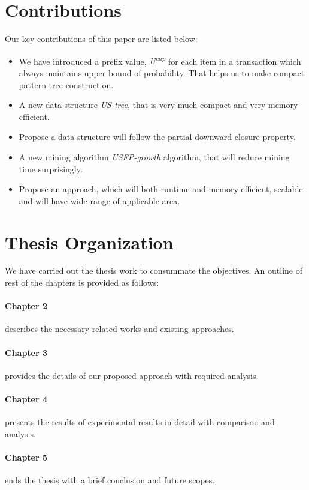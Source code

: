\section{Contributions}
Our key contributions of this paper are listed below:
\begin{itemize}
	\item We have introduced a prefix value, \emph{U\textsuperscript{cap}} for each item in a transaction which always maintains upper bound of probability. That helps us to make compact pattern tree construction.
	\item A new data-structure \emph{US-tree}, that is very much compact and very memory efficient.
	\item Propose a data-structure will follow the partial downward closure property.
	\item A new mining algorithm \emph{USFP-growth} algorithm, that will reduce mining time surprisingly.
	\item Propose an approach, which will both runtime and memory efficient, scalable and will have wide range of applicable area.
	\end{itemize}
\section{Thesis Organization}
	We have carried out the thesis work to consummate the objectives. An outline of rest of the chapters is provided as follows:
	\paragraph{Chapter 2} describes the necessary related works and existing approaches.
	\paragraph{Chapter 3} provides the details of our proposed approach with required analysis.
	\paragraph{Chapter 4} presents the results of experimental results in detail with comparison and analysis.
	\paragraph{Chapter 5} ends the thesis with a brief conclusion and future scopes.
%
